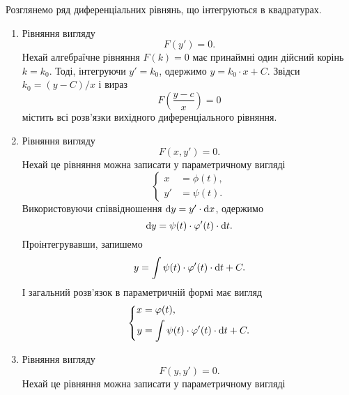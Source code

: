 Розглянемо ряд диференціальних рівнянь, що інтегруються в квадратурах.
\begin{enumerate}
	\item Рівняння вигляду 
	\begin{equation*}
		F(y') = 0.
	\end{equation*}
	Нехай алгебраїчне рівняння $F(k) = 0$ має принаймні один дійсний корінь $k = k_0$. Тоді, інтегруючи $y' = k_0$, одержимо $y = k_0 \cdot x + C$. Звідси $k_0 = (y - C) / x$ і вираз
	\begin{equation*}
		F \left( \frac{y - c}{x} \right) = 0	
	\end{equation*}
	містить всі розв’язки вихідного диференціального рівняння.
	\item Рівняння вигляду 
	\begin{equation*}
		F(x, y') = 0.
	\end{equation*}
	Нехай це рівняння можна записати у параметричному вигляді
	\begin{equation*}
		\left\{\begin{aligned}
			x &= \phi(t), \\
			y' &= \psi(t).
		\end{aligned}\right.
	\end{equation*}
	Використовуючи співвідношення $\mathop{}\!\mathrm{d} y = y ' \cdot \mathop{}\!\mathrm{d} x$, одержимо 
	\begin{equation*}
		\mathop{}\!\mathrm{d} y = \psi(t) \cdot \varphi'(t) \cdot \mathop{}\!\mathrm{d} t.
	\end{equation*}
	Проінтегрувавши, запишемо
	\begin{equation*}
		y = \int \psi(t) \cdot \varphi'(t) \cdot \mathop{}\!\mathrm{d} t + C.
	\end{equation*}
	І загальний розв’язок в параметричній формі має вигляд
	\begin{equation*}
		\left\{\begin{aligned}
		x &= \varphi(t), \\
		y &= \int \psi(t) \cdot \varphi'(t) \cdot \mathop{}\!\mathrm{d} t + C.
		\end{aligned}\right.
	\end{equation*}
	\item Рівняння вигляду 
	\begin{equation*}
		F(y, y') = 0.
	\end{equation*}
	Нехай це рівняння можна записати у параметричному вигляді
	\begin{equation*}

\end{equation*}
\end{enumerate}
